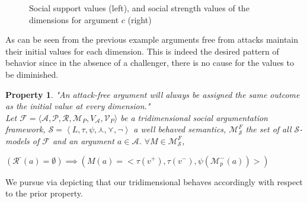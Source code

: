 \documentclass{article}
\newtheorem{property}{Property}
\newcommand{\args}{\mathcal{A}} %
\newcommand{\att}{\mathcal{R}}  %
\newcommand{\varg}{V_{\args}}   %
\newcommand{\attackers}[1]{\att^\text{-}\left(#1\right)}
\begin{document}
\begin{figure}[h!]
{
}
  \caption{Social support values  (left), and social strength values of the dimensions for argument $c$ (right)}  
\end{figure}

\newpage

As can be seen from the previous example arguments free from attacks maintain their initial values for each dimension. This is indeed the desired pattern of behavior since in the absence of a challenger, there is no cause for the values to be diminished. 

 \begin{property}
\label{unattacked}
"An attack-free argument will always be assigned the same outcome as the initial value at every dimension." \\
Let $\mathcal{F} = \langle \args, \mathcal{P}, \att, \mathcal{M}_P,  \varg, \mathcal{V}_P \rangle$ be a tridimensional social argumentation framework,  $\mathcal{S}=\left\langle L,\tau,\psi, \curlywedge,\curlyvee,\lnot\right\rangle$ a well behaved semantics, $\mathcal{\mathcal{M}}^F_{\mathcal{S}}$ the set of all $\mathcal{S}$-models of $\mathcal{F}$ and an argument $a \in \args$. $\forall M \in \mathcal{M}^F_{\mathcal{S}}$,
\begin{center}
$\left( \attackers {a }= \emptyset \right) \implies \left(M(a) = <\tau(v^+), \tau(v^-), \psi(\mathcal{M}_{p}^{-}(a))> \right)$
\end{center}

\end{property}

We pursue via depicting that our tridimensional behaves accordingly with respect to the  prior property.
\end{document}
